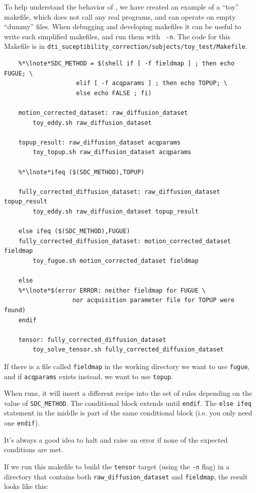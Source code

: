 To help understand the behavior of \maken{}, we have created an
example of a ``toy'' makefile, which does not call any real programs,
and can operate on empty ``dummy'' files. When debugging and
developing makefiles it can be useful to write such simplified
makefiles, and run them with \maken{}~\texttt{-n}. The code for this
Makefile is in \texttt{dti_suceptibility_correction/subjects/toy_test/Makefile}.


\begin{lstlisting}
	%*\lnote*SDC_METHOD = $(shell if [ -f fieldmap ] ; then echo FUGUE; \
                    elif [ -f acqparams ] ; then echo TOPUP; \
                    else echo FALSE ; fi)

	motion_corrected_dataset: raw_diffusion_dataset
	    toy_eddy.sh raw_diffusion_dataset

	topup_result: raw_diffusion_dataset acqparams
	    toy_topup.sh raw_diffusion_dataset acqparams

	%*\lnote*ifeq ($(SDC_METHOD),TOPUP)

	fully_corrected_diffusion_dataset: raw_diffusion_dataset topup_result
	    toy_eddy.sh raw_diffusion_dataset topup_result

	else ifeq ($(SDC_METHOD),FUGUE)
	fully_corrected_diffusion_dataset: motion_corrected_dataset fieldmap
	    toy_fugue.sh motion_corrected_dataset fieldmap
	    
	else
	%*\lnote*$(error ERROR: neither fieldmap for FUGUE \
	               nor acquisition parameter file for TOPUP were found)
	endif

	tensor: fully_corrected_diffusion_dataset
	    toy_solve_tensor.sh fully_corrected_diffusion_dataset

\end{lstlisting}


If there is a file called \texttt{fieldmap} in the working directory we want to use \texttt{fugue}, and if \texttt{acqparams} exists instead, we want to use \texttt{topup}.

When \maken{} runs, it will insert a different recipe into the set of rules depending on the value of \texttt{SDC_METHOD}. The conditional block extends until \texttt{endif}. The \texttt{else ifeq} statement in the middle is part of the same conditional block (i.e. you only need one \texttt{endif}).

It's always a good idea to halt and raise an error if none of the expected conditions are met. \break

If we run this makefile to build the \texttt{tensor} target (using the \texttt{-n} flag) in a directory that contains both \texttt{raw_diffusion_dataset} and \texttt{fieldmap}, the result looks like this:

